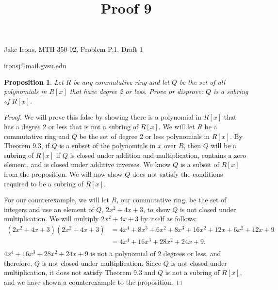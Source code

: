 \documentclass[11 pt]{article}
\title{Proof 9}
\newtheorem{proposition}{Proposition}
\newcommand{\newpar}{\vspace{.15in}\noindent}
\begin{document}
\noindent Jake Irons, MTH 350-02, Problem P.1, Draft 1

\noindent ironsj@mail.gvsu.edu

\newpar
\begin{proposition}
Let $R$ be any commutative ring and let $Q$ be the set of all polynomials in $R[x]$ that have degree 2 or less. Prove or disprove: $Q$ is a subring of $R[x]$.
\end{proposition}
\begin{proof}
\newpar 
We will prove this false by showing there is a polynomial in $R[x]$ that has a degree 2 or less that is not a subring of $R[x]$. We will let $R$ be a commutative ring and $Q$ be the set of degree 2 or less polynomials in $R[x]$. By Theorem 9.3, if $Q$ is a subset of the polynomials in $x$ over $R$, then $Q$ will be a subring of $R[x]$ if $Q$ is closed under addition and multiplication, contains a zero element, and is closed under additive inverses. We know $Q$ is a subset of $R[x]$ from the proposition. We will now show $Q$ does not satisfy the conditions required to be a subring of $R[x]$.

\newpar
For our counterexample, we will let $R$, our commutative ring, be the set of integers and use an element of $Q$, $2x^2+4x+3$, to show $Q$ is not closed under multiplication. We will multiply $2x^2+4x+3$ by itself as follows:
\begin{align*}
(2x^2+4x+3)(2x^2+4x+3)&=4x^4+8x^3+6x^2+8x^3+16x^2+12x+6x^2+12x+9 \\
&= 4x^4+16x^3+28x^2+24x+9. \\
\end{align*}
\noindent
$4x^4+16x^3+28x^2+24x+9$ is not a polynomial of 2 degrees or less, and therefore, $Q$ is not closed under multiplication. Since $Q$ is not closed under multiplication, it does not satisfy Theorem 9.3 and $Q$ is not a subring of $R[x]$, and we have shown a counterexample to the proposition.
\end{proof}
\end{document}

